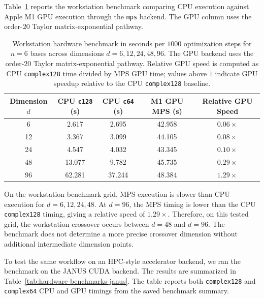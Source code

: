 \documentclass[a4paper,twocolumn,11pt,amsfonts,amssymb]{quantumarticle}
\begin{document}
Table~\ref{tab:hardware-benchmarks} reports the workstation benchmark comparing CPU execution against Apple M1 GPU execution through the \texttt{mps} backend. The GPU column uses the order-\(20\) Taylor matrix-exponential pathway.
\begin{table}[ht]
  \caption{Workstation hardware benchmark in seconds per \(1000\) optimization steps for \(n=6\) bases across dimensions \(d=6,12,24,48,96\). The GPU backend uses the order-\(20\) Taylor matrix-exponential pathway. Relative GPU speed is computed as CPU \texttt{complex128} time divided by MPS GPU time; values above \(1\) indicate GPU speedup relative to the CPU \texttt{complex128} baseline.}
  \label{tab:hardware-benchmarks}
  \begin{tabular}{ccccc}
    \toprule
    Dimension \(d\) & CPU \texttt{c128} (s) & CPU \texttt{c64} (s) & M1 GPU MPS (s) & Relative GPU Speed \\
    \midrule
    6  & 2.617  & 2.695  & 42.958 & \(0.06\times\) \\
    12 & 3.367  & 3.099  & 44.105 & \(0.08\times\) \\
    24 & 4.547  & 4.032  & 43.345 & \(0.10\times\) \\
    48 & 13.077 & 9.782  & 45.735 & \(0.29\times\) \\
    96 & 62.281 & 37.244 & 48.384 & \(1.29\times\) \\
    \bottomrule
  \end{tabular}
\end{table}

On the workstation benchmark grid, MPS execution is slower than CPU execution for \(d=6,12,24,48\). At \(d=96\), the MPS timing is lower than the CPU \texttt{complex128} timing, giving a relative speed of \(1.29\times\). Therefore, on this tested grid, the workstation crossover occurs between \(d=48\) and \(d=96\). The benchmark does not determine a more precise crossover dimension without additional intermediate dimension points.

To test the same workflow on an HPC-style accelerator backend, we ran the benchmark on the JANUS CUDA backend. The results are summarized in Table~\ref{tab:hardware-benchmarks-janus}. The table reports both \texttt{complex128} and \texttt{complex64} CPU and GPU timings from the saved benchmark summary.
\end{document}
